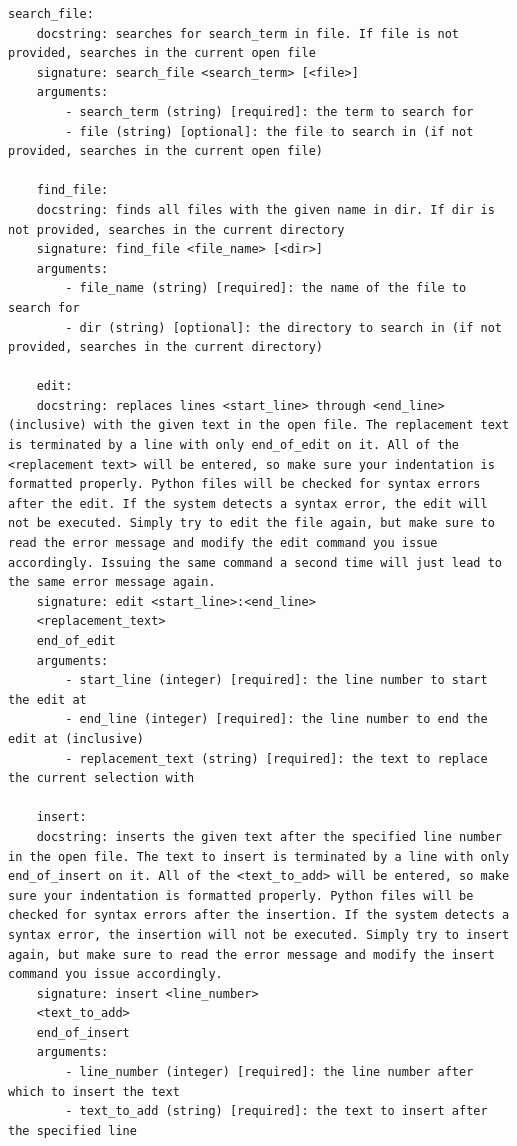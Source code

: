 \documentclass[]{fairmeta}
\begin{document}
\begin{lstlisting}[caption={System Propmt}, label={lst:system_prompt}, captionpos=t]
    search_file:
    docstring: searches for search_term in file. If file is not provided, searches in the current open file
    signature: search_file <search_term> [<file>]
    arguments:
        - search_term (string) [required]: the term to search for
        - file (string) [optional]: the file to search in (if not provided, searches in the current open file)

    find_file:
    docstring: finds all files with the given name in dir. If dir is not provided, searches in the current directory
    signature: find_file <file_name> [<dir>]
    arguments:
        - file_name (string) [required]: the name of the file to search for
        - dir (string) [optional]: the directory to search in (if not provided, searches in the current directory)

    edit:
    docstring: replaces lines <start_line> through <end_line> (inclusive) with the given text in the open file. The replacement text is terminated by a line with only end_of_edit on it. All of the <replacement text> will be entered, so make sure your indentation is formatted properly. Python files will be checked for syntax errors after the edit. If the system detects a syntax error, the edit will not be executed. Simply try to edit the file again, but make sure to read the error message and modify the edit command you issue accordingly. Issuing the same command a second time will just lead to the same error message again.
    signature: edit <start_line>:<end_line>
    <replacement_text>
    end_of_edit
    arguments:
        - start_line (integer) [required]: the line number to start the edit at
        - end_line (integer) [required]: the line number to end the edit at (inclusive)
        - replacement_text (string) [required]: the text to replace the current selection with

    insert:
    docstring: inserts the given text after the specified line number in the open file. The text to insert is terminated by a line with only end_of_insert on it. All of the <text_to_add> will be entered, so make sure your indentation is formatted properly. Python files will be checked for syntax errors after the insertion. If the system detects a syntax error, the insertion will not be executed. Simply try to insert again, but make sure to read the error message and modify the insert command you issue accordingly.
    signature: insert <line_number>
    <text_to_add>
    end_of_insert
    arguments:
        - line_number (integer) [required]: the line number after which to insert the text
        - text_to_add (string) [required]: the text to insert after the specified line


\end{lstlisting}
\end{document}
